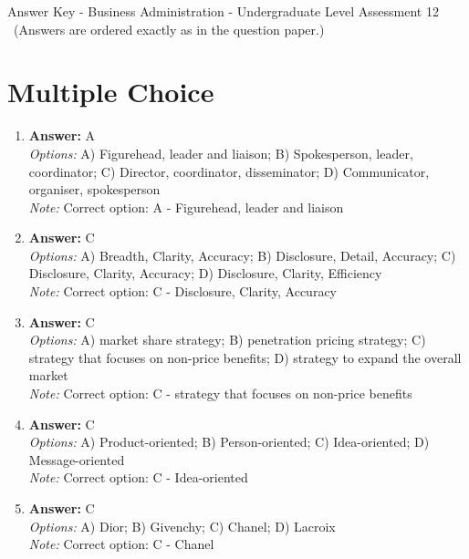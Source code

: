 \documentclass[12pt]{article}
\begin{document}
\begin{center}
Answer Key - Business Administration - Undergraduate Level Assessment 12 \
\small (Answers are ordered exactly as in the question paper.)
\end{center}

\section*{Multiple Choice}
\begin{enumerate}[label=\arabic*.]
\item \textbf{Answer:} A
\\ \textit{Options:} A) Figurehead, leader and liaison; B) Spokesperson, leader, coordinator; C) Director, coordinator, disseminator; D) Communicator, organiser, spokesperson
\\ \textit{Note:} Correct option: A - Figurehead, leader and liaison
\item \textbf{Answer:} C
\\ \textit{Options:} A) Breadth, Clarity, Accuracy; B) Disclosure, Detail, Accuracy; C) Disclosure, Clarity, Accuracy; D) Disclosure, Clarity, Efficiency
\\ \textit{Note:} Correct option: C - Disclosure, Clarity, Accuracy
\item \textbf{Answer:} C
\\ \textit{Options:} A) market share strategy; B) penetration pricing strategy; C) strategy that focuses on non-price benefits; D) strategy to expand the overall market
\\ \textit{Note:} Correct option: C - strategy that focuses on non-price benefits
\item \textbf{Answer:} C
\\ \textit{Options:} A) Product-oriented; B) Person-oriented; C) Idea-oriented; D) Message-oriented
\\ \textit{Note:} Correct option: C - Idea-oriented
\item \textbf{Answer:} C
\\ \textit{Options:} A) Dior; B) Givenchy; C) Chanel; D) Lacroix
\\ \textit{Note:} Correct option: C - Chanel
\end{enumerate}
\end{document}
